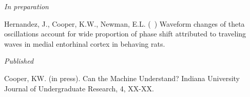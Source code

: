 \begin{cvpubentries}


\iftrue
  \cvpubentry
    {\textit{In preparation}} %
    { } %
    { } %
    { } %
    {
      \begin{cvpubitems} %
        \item {Hernandez,  J.,  Cooper,  K.W.,  Newman,  E.L.  (~)  Waveform  changes  of  theta  oscillations  account  for  wide  proportion  of  phase  shift  attributed  to  traveling  waves  in  medial  entorhinal  cortex  in  behaving  rats. }
      \end{cvpubitems}
    }
\fi

\iffalse
  \cvpubentry
    {\textit{In press}} %
    {} %
    {} %
    {} %
    {
      \begin{cvpubitems} %
        \item {pub}
      \end{cvpubitems}
    }
\fi

  \cvpubentry
    {\textit{Published}} %
    {} %
    {} %
    {} %
    {
      \begin{cvpubitems} %
        \item {Cooper, KW. (in press). Can the Machine Understand? Indiana University Journal of Undergraduate Research, 4, XX-XX.}
      \end{cvpubitems}
    }
\iffalse %
\fi


\end{cvpubentries}
